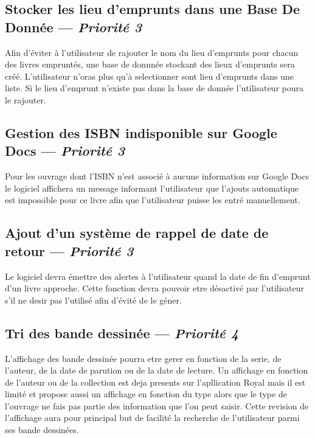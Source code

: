 \subsection[Stocker les lieu d'emprunts dans une Base De Donnée]{Stocker les lieu d'emprunts dans une Base De Donnée — \emph{Priorité 3}}
Afin d'éviter à l'utilisateur de rajouter le nom du lieu d'emprunts pour chacun des livres empruntés, une base de donnnée stockant des lieux d'emprunts sera créé. L'utilisateur n'oras plus qu'à selectionner sont lieu d'emprunts dans une liste. Si le lieu d'emprunt n'existe pas dans la base de donnée l'utilisateur poura le rajouter.

\subsection[Gestion des ISBN indisponible sur Google Docs]{Gestion des ISBN indisponible sur Google Docs — \emph{Priorité 3}}
Pour les ouvrage dont l'ISBN n'est associé à aucune information sur Google Docs le logiciel affichera un message informant l'utilisateur que l'ajouts automatique est impossible pour ce livre afin que l'utilisateur puisse les entré manuellement.   

\subsection[Ajout d'un système de rappel de date de retour]{Ajout d'un système de rappel de date de retour — \emph{Priorité 3}}
Le logiciel devra émettre des alertes à l'utilisateur quand la date de fin d'emprunt d'un livre approche. Cette fonction devra pouvoir etre désactivé par l'utilisateur s'il ne desir pas l'utilisé afin d'évité de le géner.


\subsection[Tri des bande dessinée]{Tri des bande dessinée — \emph{Priorité 4}}
L'affichage des bande dessinée pourra etre gerer en fonction de la serie, de l'auteur, de la date de parution ou de la date de lecture. Un affichage en fonction de l'auteur ou de la collection est deja presents sur l'apllication Royal mais il est limité et propose aussi un affichage en fonction du type alors que le type de l'ouvrage ne fais pas partie des information que l'on peut saisir. Cette revision de l'affichage aura pour principal but de facilité la recherche de l'utilisateur parmi ses bande dessinées.

